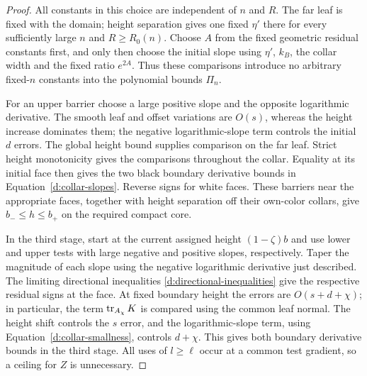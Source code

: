 \begin{proof}
All constants in this choice are independent of $n$ and $R$.
The far leaf is fixed with the domain; height separation gives one
fixed $\eta'$ there for every sufficiently large $n$ and
$R\ge R_0(n)$.  Choose $A$ from the fixed geometric residual
constants first, and only then choose the initial slope using
$\eta'$, $k_B$, the collar width and the fixed ratio $e^{2A}$.
Thus these comparisons introduce no arbitrary fixed-$n$ constants
into the polynomial bounds $\Pi_n$.

For an upper barrier choose a large positive slope and the opposite
logarithmic derivative.  The smooth leaf and offset variations are
$O(s)$, whereas the height increase dominates them; the negative
logarithmic-slope term controls the initial $d$ errors.  The global
height bound supplies comparison on the far leaf.  Strict height
monotonicity gives the comparisons throughout the collar.  Equality
at its initial face then gives the two black boundary derivative
bounds in Equation~\eqref{d:collar-slopes}.  Reverse signs for white
faces.  These barriers near the appropriate faces, together with
height separation off their own-color collars, give
$b_-\le h\le b_+$ on the required compact core.

In the third stage, start at the current assigned height
$(1-\zeta)b$ and use lower and upper tests with large negative and
positive slopes, respectively.  Taper the magnitude of each slope
using the negative logarithmic derivative just described.  The
limiting directional inequalities
\eqref{d:directional-inequalities} give the respective residual signs
at the face.  At fixed boundary height the errors are
$O(s+d+\chi)$; in particular, the term $\operatorname{tr}_{A_\chi}K$ is compared
using the common leaf normal.  The height shift controls the $s$
error, and the logarithmic-slope term, using
Equation~\eqref{d:collar-smallness}, controls $d+\chi$.  This gives
both boundary derivative bounds in the third stage.  All uses of
$l\ge\ell$ occur at a common test gradient, so a ceiling for $Z$ is
unnecessary.
\end{proof}
